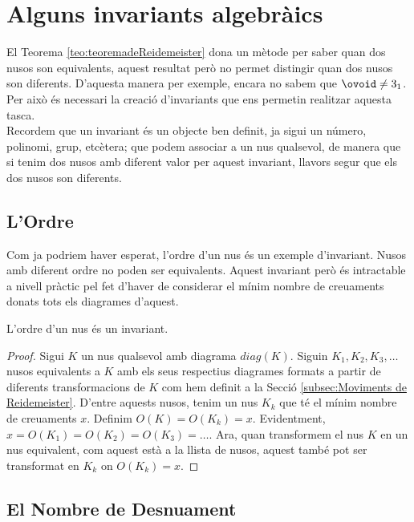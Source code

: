 
\section{Alguns invariants algebràics}\label{sec:Invariantsalgebraics}

El Teorema \ref{teo:teoremadeReidemeister} dona un mètode per saber quan dos nusos son equivalents, aquest resultat però no permet distingir quan dos nusos son diferents. D'aquesta manera per exemple, encara no sabem que $\ovoid\neq 3_1$. Per això és necessari la creació d'invariants que ens permetin realitzar aquesta tasca.\\

Recordem que un invariant és un objecte ben definit, ja sigui un número, polinomi, grup, etcètera; que podem associar a un nus qualsevol, de manera que si tenim dos nusos amb diferent valor per aquest invariant, llavors segur que els dos nusos son diferents.

\subsection{L'Ordre}\label{sec:ordrecomainvariant}

Com ja podriem haver esperat, l'ordre d'un nus és un exemple d'invariant. Nusos amb diferent ordre no poden ser equivalents. Aquest invariant però és intractable a nivell pràctic pel fet d'haver de considerar el mínim nombre de creuaments donats tots els diagrames d'aquest.\\

\begin{proposition}
	L'ordre d'un nus és un invariant.
\end{proposition}

\begin{proof}
	Sigui $K$ un nus qualsevol amb diagrama $diag(K)$. Siguin $K_1, K_2, K_3, \dots$ nusos equivalents a $K$ amb els seus respectius diagrames formats a partir de diferents transformacions de $K$ com hem definit a la Secció \ref{subsec:Moviments de Reidemeister}. D'entre aquests nusos, tenim un nus $K_k$ que té el mínim nombre de creuaments $x$. Definim $O(K)=O(K_k)=x$. Evidentment, $x=O(K_1)=O(K_2)=O(K_3)=\dots$. Ara, quan transformem el nus $K$ en un nus equivalent, com aquest està a la llista de nusos, aquest també pot ser transformat en $K_k$ on $O(K_k)=x$.
\end{proof}

\subsection{El Nombre de Desnuament}\label{sec:desnuamentcomainvariant}

